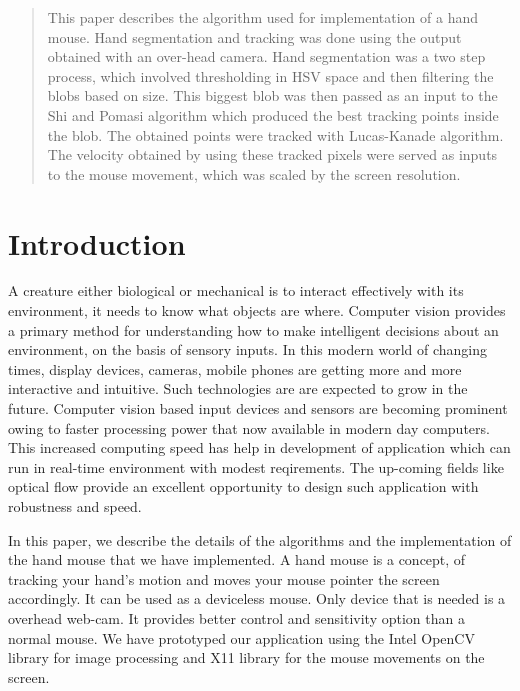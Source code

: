 \documentclass{sig-alternate}
\begin{document}
\maketitle
\begin{abstract}
This paper describes the algorithm used for implementation of a hand mouse. Hand segmentation
and tracking was done using the output obtained with an over-head camera. Hand segmentation
was a two step process, which involved thresholding in HSV space and then filtering the blobs 
based on size. This biggest blob was then passed as an input to the Shi and Pomasi algorithm 
which produced the best tracking points inside the blob.
The obtained points were tracked with Lucas-Kanade algorithm. The velocity obtained \cite{bowman:reasoning}
by using these tracked pixels were served as inputs to the mouse movement, which was scaled by the screen resolution.
\end{abstract}




\section{Introduction}
A creature either biological or mechanical is to interact effectively with its environment,  it
needs to know what objects are where. Computer vision provides a primary method for understanding 
how to make intelligent decisions about an environment, on the basis of sensory inputs.
In this modern world of changing times, display devices, cameras, mobile phones are getting more 
and more interactive and intuitive. Such technologies are are expected to grow in the future.
Computer vision based input devices and sensors are becoming prominent owing to faster 
processing power that now available in modern day computers. This increased computing speed 
has help in development of application which can run in real-time environment with modest
reqirements. The up-coming fields like optical flow provide an excellent opportunity to design such 
application with robustness and speed. 

In this paper, we describe the details of the algorithms and the implementation of the hand mouse
that we have implemented. A hand mouse is a concept, of tracking your hand's motion and 
moves your mouse pointer the screen accordingly. It can be used as a deviceless mouse. 
Only device that is needed is a overhead web-cam. It provides better control and sensitivity 
option than a normal mouse. We have prototyped our application using the Intel OpenCV library for
image processing and X11 library for the mouse movements on the screen.
\end{document}
